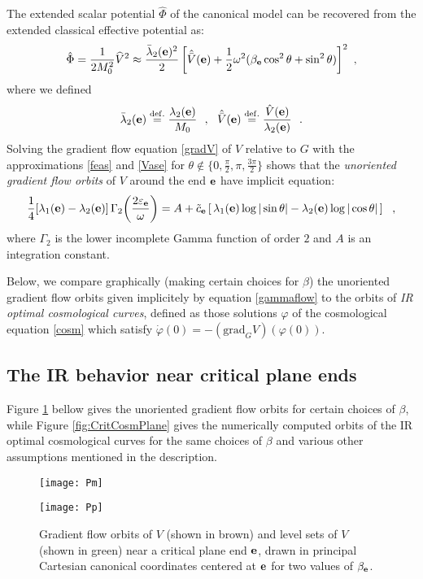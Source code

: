 \documentclass[a4paper,11pt]{article}
\theoremstyle{plain}
\theoremstyle{definition}
\theoremstyle{remark}
\newcommand{\be}{\begin{equation*}}
\newcommand{\ee}{\end{equation*}}
\newcommand{\ben}{\begin{equation}}
\newcommand{\een}{\end{equation}}
\def\hV{\widehat{V}}
\def\e{{\bf e}}
\newcommand{\eqdef}{\stackrel{{\rm def.}}{=}}
\def\grad{\mathrm{grad}}
\def\hV{\widehat{V}}
\def\hPhi{{\hat \Phi}}
\begin{document}
The extended scalar potential $\hPhi$ of the canonical model can be
recovered from the extended classical effective potential as:
\ben
\label{Phic}
\hPhi=\frac{1}{2 M_0^2} \hV^2\approx \frac{{\bar \lambda}_2(\e)^2}{2}\left[\hat{\bar{V}}(\e)+\frac{1}{2}\omega^2 (\beta_\e \cos^2\theta+\sin^2\theta)\right]^2~,
\een
where we defined 
\be
{\bar \lambda}_2(\e)\eqdef \frac{\lambda_2(\e)}{M_0}~~,~~{\hat {\bar V}}(\e)\eqdef \frac{{\hat V}(\e)}{\lambda_2(\e)}~~.
\ee
Solving the gradient flow equation \eqref{gradV} of $V$ relative to
$G$ with the approximations \eqref{feas} and \eqref{Vase} for
$\theta\not \in \{0,\frac{\pi}{2},\pi,\frac{3\pi}{2}\}$ shows that the
{\em unoriented gradient flow orbits} of $V$ around the end $\e$ have
implicit equation:
\ben
\label{gammaflow}
\frac{1}{4}[\lambda_1(\e)-\lambda_2(\e)]\,\Gamma_2\!
\left(\frac{2\varepsilon_\e}{\omega}\right)=A+{\tilde c}_\e\left[\,\lambda_1(\e)\log|\sin\theta|-\lambda_2(\e)\log|\cos\theta |\,\right]~~,
\een
where $\Gamma_2$ is the lower incomplete Gamma function of order $2$ and $A$ is an integration constant.

Below, we compare graphically (making certain choices for $\beta$) the unoriented gradient flow orbits given implicitely by equation \eqref{gammaflow} to the orbits of {\em IR optimal cosmological curves}, defined as those
solutions $\varphi$ of the cosmological equation \eqref{cosm} which satisfy
$\dot\varphi(0)=-(\grad_G V)(\varphi(0))$. 

\subsection{The IR behavior near critical plane ends}

Figure \ref{fig:CritPlanePQ} bellow gives the unoriented gradient flow orbits for certain choices of $\beta$, while Figure \ref{fig:CritCosmPlane} gives the numerically computed orbits of the IR optimal cosmological curves for the same choices of $\beta$ and various other assumptions mentioned in the description. 

\begin{figure}[H]
\centering
\begin{minipage}{.47\textwidth}
\centering \texttt{[image: Pm]}
\subcaption{For $\beta_\e=-0.5$}
\end{minipage}\hfill 
\begin{minipage}{.47\textwidth}
\centering \texttt{[image: Pp]}
\subcaption{For $\beta_\e=0.5$}
\end{minipage}
\caption{Gradient flow orbits of $V$ (shown in brown) and level sets
of $V$ (shown in green) near a critical plane end $\e$, drawn in
principal Cartesian canonical coordinates centered at $\e$ for two
values of $\beta_\e$.}
\label{fig:CritPlanePQ}
\end{figure}
\end{document}
